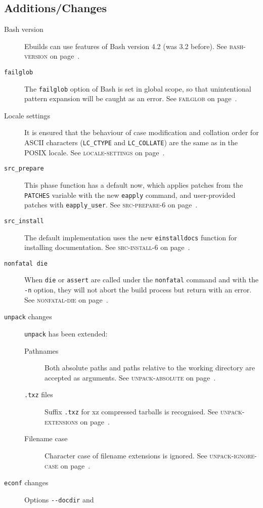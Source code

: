 \documentclass[a4paper,nofoldmark]{leaflet}
\newcommand{\code}[1]{\texttt{#1}}
\newcommand{\featureref}[1]{\textsc{#1} on page~\pageref{feat:#1}}
\begin{document}
\subsection{Additions/Changes}
\label{sec:cs:eapi6-additions}
\begin{description}
    \item[Bash version] Ebuilds can use features of Bash version 4.2
    (was 3.2 before).
    See \featureref{bash-version}.
    \item[\code{failglob}] The \code{failglob} option of Bash is set
    in global scope, so that unintentional pattern expansion will be
    caught as an error.
    See \featureref{failglob}.
    \item[Locale settings] It is ensured that the behaviour of case
    modification and collation order for ASCII characters
    (\code{LC_CTYPE} and \code{LC_COLLATE}) are the same as in the
    POSIX locale.
    See \featureref{locale-settings}.
    \item[\code{src_prepare}] This phase function has a default now,
    which applies patches from the \code{PATCHES} variable with the
    new \code{eapply} command, and user-provided patches with
    \code{eapply_user}.
    See \featureref{src-prepare-6}.
    \item[\code{src_install}] The default implementation uses the new
    \code{einstalldocs} function for installing documentation.
    See \featureref{src-install-6}.
    \item[\code{nonfatal die}] When \code{die} or \code{assert} are
    called under the \code{nonfatal} command and with the \code{-n}
    option, they will not abort the build process but return with an
    error.
    See \featureref{nonfatal-die}.
    \item[\code{unpack} changes] \code{unpack} has been extended:
    \begin{description}
        \item[Pathnames] Both absolute paths and paths relative to the
        working directory are accepted as arguments.
        See \featureref{unpack-absolute}.
        \item[\code{.txz} files] Suffix \code{.txz} for xz compressed
        tarballs is recognised.
        See \featureref{unpack-extensions}.
        \item[Filename case] Character case of filename extensions is
        ignored.
        See \featureref{unpack-ignore-case}.
    \end{description}
    \item[\code{econf} changes] Options \code{-{}-docdir} and

\end{description}
\end{document}
